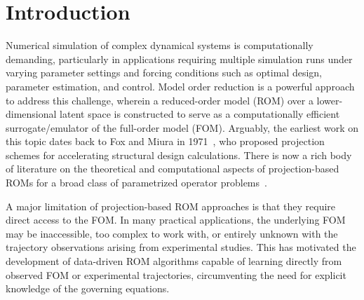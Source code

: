 \documentclass{article}
\begin{document}
	\section{Introduction}
	
	Numerical simulation of complex dynamical systems is computationally demanding, particularly in applications requiring multiple simulation runs under varying parameter settings and forcing conditions such as optimal design, parameter estimation, and control. 
	Model order reduction is a powerful approach to address this challenge, wherein a reduced-order model (ROM) over a lower-dimensional latent space is constructed to serve as a computationally efficient surrogate/emulator of the full-order model (FOM). Arguably, the earliest work on this topic dates back to Fox and Miura in 1971~\cite{FoxMiura1971}, who proposed projection schemes for  accelerating structural design calculations. There is now a rich body of literature on the theoretical and computational aspects of projection-based ROMs for a broad class of parametrized operator problems~\cite{Benner2022}. 
	
	A major limitation of projection-based ROM approaches is that they require direct access to the FOM.  In many practical applications, the underlying FOM may be inaccessible, too complex to work with, or entirely unknown with the trajectory observations arising from experimental studies. This has motivated the development of data-driven ROM algorithms capable of learning directly from observed FOM or experimental trajectories, circumventing the need for explicit knowledge of the governing equations.
	
\end{document}

